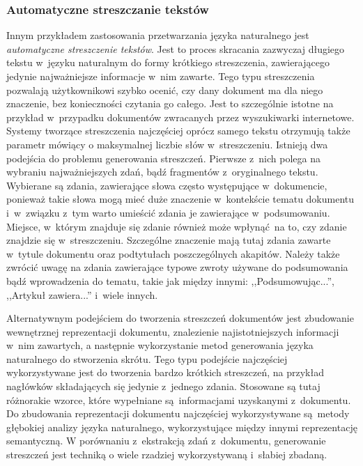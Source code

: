 \documentclass[a4paper, twoside, 12pt]{report}
\begin{document}
            \subsubsection{Automatyczne streszczanie tekstów}
                Innym przykładem zastosowania przetwarzania języka naturalnego jest \emph{automatyczne streszczenie tekstów}.
                Jest to proces skracania zazwyczaj długiego tekstu w~języku naturalnym do formy krótkiego streszczenia,
                zawierającego jedynie najważniejsze informacje w~nim zawarte. Tego typu streszczenia pozwalają
                użytkownikowi szybko ocenić, czy dany dokument ma dla niego znaczenie, bez konieczności czytania go całego.
                Jest to szczególnie istotne na przykład w~przypadku dokumentów zwracanych przez wyszukiwarki internetowe.
                Systemy tworzące streszczenia najczęściej oprócz samego tekstu otrzymują także parametr
                mówiący o maksymalnej liczbie słów w~streszczeniu. Istnieją dwa podejścia do problemu generowania streszczeń.
                Pierwsze z~nich polega na wybraniu najważniejszych zdań, bądź fragmentów z~oryginalnego tekstu. Wybierane
                są zdania, zawierające słowa często występujące w~dokumencie, ponieważ takie słowa mogą mieć duże znaczenie
                w~kontekście tematu dokumentu i~w~związku z~tym warto umieścić zdania je zawierające w~podsumowaniu. Miejsce,
                w~którym znajduje się zdanie również może wpłynąć na to, czy zdanie znajdzie się w~streszczeniu. Szczególne
                znaczenie mają tutaj zdania zawarte w~tytule dokumentu oraz podtytułach poszczególnych akapitów. Należy
                także zwrócić uwagę na zdania zawierające typowe zwroty używane do podsumowania bądź wprowadzenia do tematu,
                takie jak między innymi: ,,Podsumowując...'', ,,Artykuł zawiera...'' i~wiele innych.

                Alternatywnym podejściem do tworzenia streszczeń dokumentów jest zbudowanie wewnętrznej reprezentacji
                dokumentu, znalezienie najistotniejszych informacji w~nim zawartych, a następnie wykorzystanie metod
                generowania języka naturalnego do stworzenia skrótu. Tego typu podejście najczęściej wykorzystywane jest
                do tworzenia bardzo krótkich streszczeń, na przykład nagłówków składających się jedynie z~jednego zdania.
                Stosowane są tutaj różnorakie wzorce, które wypełniane są informacjami uzyskanymi z~dokumentu. Do zbudowania
                reprezentacji dokumentu najczęściej wykorzystywane są metody głębokiej analizy języka naturalnego,
                wykorzystujące między innymi reprezentację semantyczną. W porównaniu z~ekstrakcją zdań z~dokumentu, generowanie
                streszczeń jest techniką o wiele rzadziej wykorzystywaną i~słabiej zbadaną\cite{SUMMARIZATIONOVERVIEW}.
\end{document}

